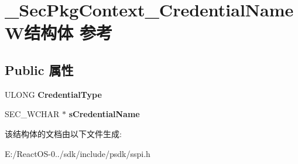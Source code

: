 \hypertarget{struct___sec_pkg_context___credential_name_w}{}\section{\+\_\+\+Sec\+Pkg\+Context\+\_\+\+Credential\+Name\+W结构体 参考}
\label{struct___sec_pkg_context___credential_name_w}
\subsection*{Public 属性}
\begin{DoxyCompactItemize}
\item 
\mbox{\label{struct___sec_pkg_context___credential_name_w_ad08874229688373404fd3268d4cfeb1b}} 
U\+L\+O\+NG {\bfseries Credential\+Type}
\item 
\mbox{\label{struct___sec_pkg_context___credential_name_w_abcd22c1dc88504c2e253ac6dcb43b6d2}} 
S\+E\+C\+\_\+\+W\+C\+H\+AR $\ast$ {\bfseries s\+Credential\+Name}
\end{DoxyCompactItemize}


该结构体的文档由以下文件生成\+:\begin{DoxyCompactItemize}
\item 
E\+:/\+React\+O\+S-\/0../sdk/include/psdk/sspi.\+h\end{DoxyCompactItemize}
